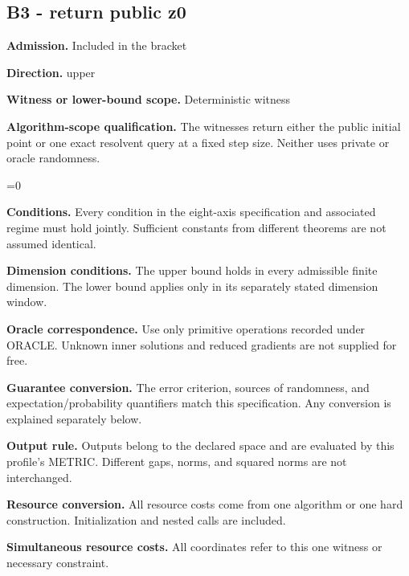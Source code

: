 \documentclass[10pt,a4paper]{article}
\newcommand{\AtlasMath}[1]{\par\begingroup\centering\setbox0=\hbox{$\displaystyle #1$}\ifdim\wd0>1.4\linewidth\typeout{ATLAS WIDE FORMULA: \the\wd0}\fi\ifdim\wd0>\linewidth\resizebox{\linewidth}{!}{\box0}\else\box0\fi\par\endgroup}
\begin{document}
\subsection{B3 - return public z0}


\textbf{Admission.} Included in the bracket



\textbf{Direction.} upper



\textbf{Witness or lower-bound scope.} Deterministic witness



\textbf{Algorithm-scope qualification.} The witnesses return either the public initial point or one exact resolvent query at a fixed step size. Neither uses private or oracle randomness.



\AtlasMath{0}


\textbf{Conditions.} Every condition in the eight-axis specification and associated regime must hold jointly. Sufficient constants from different theorems are not assumed identical.



\textbf{Dimension conditions.} The upper bound holds in every admissible finite dimension. The lower bound applies only in its separately stated dimension window.



\textbf{Oracle correspondence.} Use only primitive operations recorded under ORACLE. Unknown inner solutions and reduced gradients are not supplied for free.



\textbf{Guarantee conversion.} The error criterion, sources of randomness, and expectation/probability quantifiers match this specification. Any conversion is explained separately below.



\textbf{Output rule.} Outputs belong to the declared space and are evaluated by this profile's METRIC. Different gaps, norms, and squared norms are not interchanged.



\textbf{Resource conversion.} All resource costs come from one algorithm or one hard construction. Initialization and nested calls are included.



\textbf{Simultaneous resource costs.} All coordinates refer to this one witness or necessary constraint.
\end{document}
